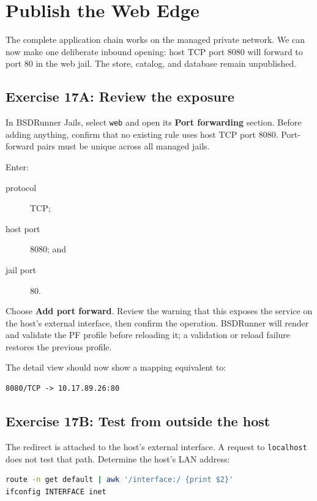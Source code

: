 \chapter{Publish the Web Edge}

The complete application chain works on the managed private network. We can
now make one deliberate inbound opening: host TCP port 8080 will forward to
port 80 in the web jail. The store, catalog, and database remain unpublished.

\section{Exercise 17A: Review the exposure}

In BSDRunner Jails, select \texttt{web} and open its \textbf{Port forwarding}
section. Before adding anything, confirm that no existing rule uses host TCP
port 8080. Port-forward pairs must be unique across all managed jails.

Enter:

\begin{description}
  \item[protocol] TCP;
  \item[host port] 8080; and
  \item[jail port] 80.
\end{description}

Choose \textbf{Add port forward}. Review the warning that this exposes the
service on the host's external interface, then confirm the operation. BSDRunner
will render and validate the PF profile before reloading it; a validation or
reload failure restores the previous profile.

The detail view should now show a mapping equivalent to:

\begin{lstlisting}
8080/TCP -> 10.17.89.26:80
\end{lstlisting}

\section{Exercise 17B: Test from outside the host}

The redirect is attached to the host's external interface. A request to
\texttt{localhost} does not test that path. Determine the host's LAN address:

\begin{lstlisting}[language=sh]
route -n get default | awk '/interface:/ {print $2}'
ifconfig INTERFACE inet
\end{lstlisting}


